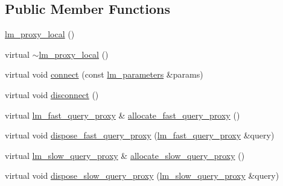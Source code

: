 \subsection*{Public Member Functions}
\begin{DoxyCompactItemize}
\item 
\hyperlink{classuva_1_1smt_1_1bpbd_1_1server_1_1lm_1_1proxy_1_1lm__proxy__local_a1aa62dbdb57c77b3014169b4b9c5c215}{lm\+\_\+proxy\+\_\+local} ()
\item 
virtual \hyperlink{classuva_1_1smt_1_1bpbd_1_1server_1_1lm_1_1proxy_1_1lm__proxy__local_ab279218f8d6268eb7702df5d3c4137ac}{$\sim$lm\+\_\+proxy\+\_\+local} ()
\item 
virtual void \hyperlink{classuva_1_1smt_1_1bpbd_1_1server_1_1lm_1_1proxy_1_1lm__proxy__local_ac39bb53d1609bb380a9e252a18023806}{connect} (const \hyperlink{structuva_1_1smt_1_1bpbd_1_1server_1_1lm_1_1lm__parameters}{lm\+\_\+parameters} \&params)
\item 
virtual void \hyperlink{classuva_1_1smt_1_1bpbd_1_1server_1_1lm_1_1proxy_1_1lm__proxy__local_a1d27c446b7f9e370c874daac3a38535a}{disconnect} ()
\item 
virtual \hyperlink{classuva_1_1smt_1_1bpbd_1_1server_1_1lm_1_1proxy_1_1lm__fast__query__proxy}{lm\+\_\+fast\+\_\+query\+\_\+proxy} \& \hyperlink{classuva_1_1smt_1_1bpbd_1_1server_1_1lm_1_1proxy_1_1lm__proxy__local_ab2c1055d26c52e84e2171811662446ab}{allocate\+\_\+fast\+\_\+query\+\_\+proxy} ()
\item 
virtual void \hyperlink{classuva_1_1smt_1_1bpbd_1_1server_1_1lm_1_1proxy_1_1lm__proxy__local_a1cc247ccdb00831f196d15cd9ab9eeaa}{dispose\+\_\+fast\+\_\+query\+\_\+proxy} (\hyperlink{classuva_1_1smt_1_1bpbd_1_1server_1_1lm_1_1proxy_1_1lm__fast__query__proxy}{lm\+\_\+fast\+\_\+query\+\_\+proxy} \&query)
\item 
virtual \hyperlink{classuva_1_1smt_1_1bpbd_1_1server_1_1lm_1_1proxy_1_1lm__slow__query__proxy}{lm\+\_\+slow\+\_\+query\+\_\+proxy} \& \hyperlink{classuva_1_1smt_1_1bpbd_1_1server_1_1lm_1_1proxy_1_1lm__proxy__local_a95bc77c757872fbdbaa65f31a8bb3228}{allocate\+\_\+slow\+\_\+query\+\_\+proxy} ()
\item 
virtual void \hyperlink{classuva_1_1smt_1_1bpbd_1_1server_1_1lm_1_1proxy_1_1lm__proxy__local_a2702b2498c14bc79df89484893ee3fc7}{dispose\+\_\+slow\+\_\+query\+\_\+proxy} (\hyperlink{classuva_1_1smt_1_1bpbd_1_1server_1_1lm_1_1proxy_1_1lm__slow__query__proxy}{lm\+\_\+slow\+\_\+query\+\_\+proxy} \&query)
\end{DoxyCompactItemize}
